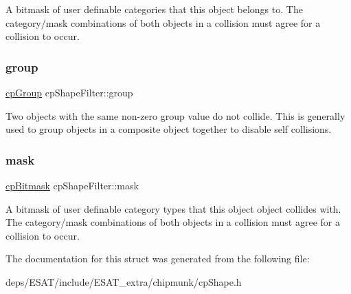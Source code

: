A bitmask of user definable categories that this object belongs to. The category/mask combinations of both objects in a collision must agree for a collision to occur. \mbox{\label{structcp_shape_filter_a6d29bf3cc7f406cdf834465f9de71c21}} 
\subsubsection{\texorpdfstring{group}{group}}
{\footnotesize\ttfamily \mbox{\hyperlink{group__basic_types_gacd811b1135a8f4a3e5cc019552b18b1a}{cp\+Group}} cp\+Shape\+Filter\+::group}

Two objects with the same non-\/zero group value do not collide. This is generally used to group objects in a composite object together to disable self collisions. \mbox{\label{structcp_shape_filter_a0ee36d60cbc25e1abf18aa1508d7a537}} 
\subsubsection{\texorpdfstring{mask}{mask}}
{\footnotesize\ttfamily \mbox{\hyperlink{group__basic_types_gae7ff94f62e00cae288c1991958822743}{cp\+Bitmask}} cp\+Shape\+Filter\+::mask}

A bitmask of user definable category types that this object object collides with. The category/mask combinations of both objects in a collision must agree for a collision to occur. 

The documentation for this struct was generated from the following file\+:\begin{DoxyCompactItemize}
\item 
deps/\+E\+S\+A\+T/include/\+E\+S\+A\+T\+\_\+extra/chipmunk/cp\+Shape.\+h\end{DoxyCompactItemize}
